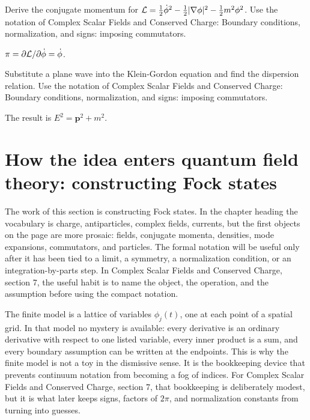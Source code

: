 \begin{exercise}
Derive the conjugate momentum for \(\mathcal L=\frac12\dot\phi^2-\frac12|\nabla\phi|^2-\frac12m^2\phi^2\).  Use the notation of Complex Scalar Fields and Conserved Charge: Boundary conditions, normalization, and signs: imposing commutators.
\begin{answer}
\(\pi=\partial\mathcal L/\partial\dot\phi=\dot\phi\).
\end{answer}
\end{exercise}

\begin{exercise}
Substitute a plane wave into the Klein-Gordon equation and find the dispersion relation.  Use the notation of Complex Scalar Fields and Conserved Charge: Boundary conditions, normalization, and signs: imposing commutators.
\begin{answer}
The result is \(E^2=\bm p^2+m^2\).
\end{answer}
\end{exercise}



\section{How the idea enters quantum field theory: constructing Fock states}

The work of this section is constructing Fock states.  In the chapter heading the vocabulary is charge, antiparticles, complex fields, currents, but the first objects on the page are more prosaic: fields, conjugate momenta, densities, mode expansions, commutators, and particles.  The formal notation will be useful only after it has been tied to a limit, a symmetry, a normalization condition, or an integration-by-parts step.  In Complex Scalar Fields and Conserved Charge, section 7, the useful habit is to name the object, the operation, and the assumption before using the compact notation.

The finite model is a lattice of variables \(\phi_j(t)\), one at each point of a spatial grid.  In that model no mystery is available: every derivative is an ordinary derivative with respect to one listed variable, every inner product is a sum, and every boundary assumption can be written at the endpoints.  This is why the finite model is not a toy in the dismissive sense.  It is the bookkeeping device that prevents continuum notation from becoming a fog of indices.  For Complex Scalar Fields and Conserved Charge, section 7, that bookkeeping is deliberately modest, but it is what later keeps signs, factors of \(2\pi\), and normalization constants from turning into guesses.

